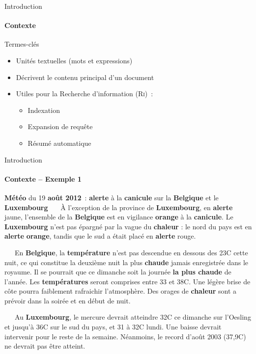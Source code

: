 \begin{frame}{Introduction}\framesubtitle{Contexte}
  \begin{block}{Termes-clés}
    \begin{itemize}
      \item{Unités textuelles (mots et expressions)}
      \item{Décrivent le contenu principal d'un document}
      \item{Utiles pour la Recherche d'information (\textsc{Ri})~:}
      \begin{itemize}
        \item{Indexation}
        \item{Expansion de requête}
        \item{Résumé automatique}
      \end{itemize}
    \end{itemize}
  \end{block}
\end{frame}

\begin{frame}{Introduction}\framesubtitle{Contexte -- Exemple 1}
  \begin{exampleblock}{\small
    \textbf{\normalsize Météo} du 19 \textbf{\normalsize août 2012}~:
    \textbf{\normalsize alerte} à la \textbf{\normalsize canicule} sur la
    \textbf{\normalsize Belgique} et le \textbf{\normalsize Luxembourg}
  }\justifying\small
    ~~~À l'exception de la province de \textbf{\normalsize Luxembourg}, en
    \textbf{\normalsize alerte} jaune, l'ensemble de la \textbf{\normalsize
    Belgique} est en vigilance \textbf{\normalsize orange} à la
    \textbf{\normalsize canicule}. Le \textbf{\normalsize Luxembourg} n'est pas
    épargné par la vague du \textbf{\normalsize chaleur} : le nord du pays est
    en \textbf{\normalsize alerte} \textbf{\normalsize orange}, tandis que le
    sud a était placé en \textbf{\normalsize alerte} rouge.

    ~~~En \textbf{\normalsize Belgique}, la \textbf{\normalsize température}
    n'est pas descendue en dessous des 23\degre{}C cette nuit, ce qui constitue
    la deuxième nuit la plus \textbf{\normalsize chaude} jamais enregistrée dans
    le royaume. Il se pourrait que ce dimanche soit la journée
    \textbf{\normalsize la plus chaude} de l'année. Les \textbf{\normalsize
    températures} seront comprises entre 33 et 38\degre{}C. Une légère brise de
    côte pourra faiblement rafraichir l'atmosphère. Des orages de
    \textbf{\normalsize chaleur} sont a prévoir dans la soirée et en début de
    nuit.

    ~~~Au \textbf{\normalsize Luxembourg}, le mercure devrait atteindre
    32\degre{}C ce dimanche sur l'Oesling et jusqu'à 36\degre{}C sur le sud du
    pays, et 31 à 32\degre{}C lundi. Une baisse devrait intervenir pour le reste
    de la semaine. Néanmoins, le record d'août 2003 (37,9\degre{}C) ne devrait
    pas être atteint.
  \end{exampleblock}
\end{frame}

